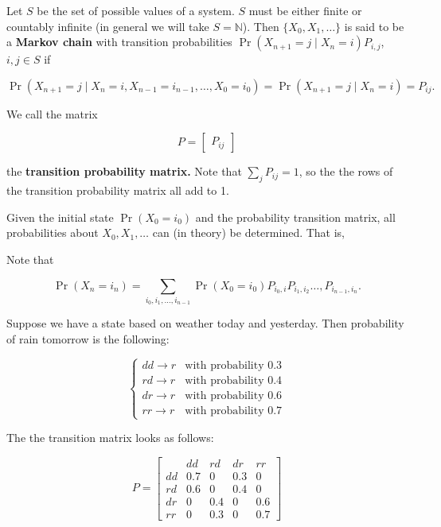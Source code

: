 \begin{definition} Let \(S\) be the set of possible values of a system. \(S\) must be either finite or countably infinite (in general we will take \(S = \mathbb{N}\)). Then \(\{X_0, X_1, \ldots \}\) is said to be a \textbf{Markov chain} with transition probabilities \( \Pr(X_{n+1}=j \mid X_{n }=i) P_{i,j}\), \(i, j \in S\) if

\[
\Pr(X_{n+1}=j \mid X_n=i, X_{n-1}=i_{n-1}, \ldots, X_0 = i_0) = \Pr(X_{n+1}=j \mid X_{n }=i) = P_{ij}.
\]

We call the matrix

\[
P = \begin{bmatrix}P_{ij} \end{bmatrix}
\]

the \textbf{transition probability matrix.} Note that \(\sum_j P_{ij} = 1\), so the the rows of the transition probability matrix all add to 1.

\end{definition}

\begin{remark}Given the initial state \(\Pr(X_0 = i_0)\) and the probability transition matrix, all probabilities about \(X_0, X_1, \ldots\) can (in theory) be determined. That is,

\end{remark}

Note that 

\[
\Pr(X_n = i_n) = \sum_{i_0, i_1, \ldots, i_{n-1}} \Pr(X_0 = i_0) P_{i_0,i} P_{i_1, i_2} \ldots, P_{i_{n-1}, i_n}.
\]

\begin{example} Suppose we have a state based on weather today and yesterday. Then probability of rain tomorrow is the following:

\[
\begin{cases}
dd \to r & \text{with probability } 0.3 \\
rd \to r & \text{with probability } 0.4 \\
dr \to r & \text{with probability } 0.6 \\
rr \to r & \text{with probability } 0.7 
\end{cases}
\]

The the transition matrix looks as follows:

\[
P = \begin{bmatrix}
 & dd & rd & dr & rr \\
 dd & 0.7 & 0&0.3 &0 \\
 rd & 0.6 & 0& 0.4 &0 \\
 dr &0 & 0.4 & 0& 0.6\\
 rr & 0& 0.3&0 & 0.7
 \end{bmatrix}
\]

\end{example}

